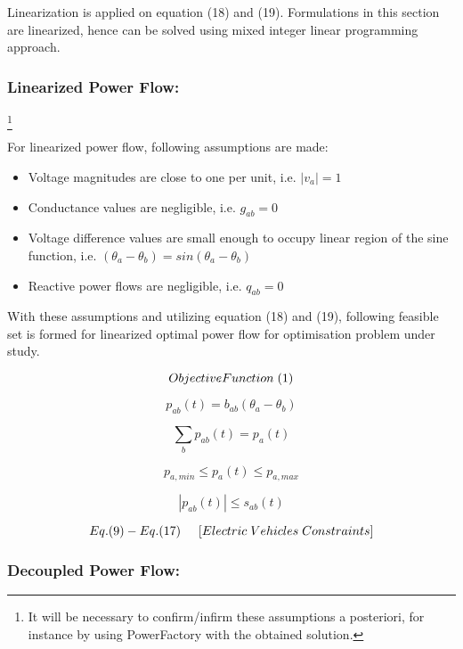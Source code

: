 Linearization is applied on equation (18) and (19). Formulations in this section are linearized, hence can be solved using mixed integer linear programming approach.

\subsubsection{Linearized Power Flow:}\footnote{It will be necessary to confirm/infirm these assumptions a posteriori, for instance by using PowerFactory with the obtained solution.}

For linearized power flow, following assumptions are made:
\begin{itemize}
    \item Voltage magnitudes are close to one per unit, i.e. $|v_a|=1$
    \item Conductance values are negligible, i.e. $g_{ab}=0$
    \item Voltage difference values are small enough to occupy linear region of the sine function, i.e. $(\theta_a - \theta_b)=sin(\theta_a - \theta_b)$
    \item Reactive power flows are negligible, i.e. $q_{ab}=0$
\end{itemize}

With these assumptions and utilizing equation (18) and (19), following feasible set is formed for linearized optimal power flow for optimisation problem under study. 

\begin{tcolorbox}[colback=gray!5!white,colframe=gray!25!black,title=Feasible Set 1 (Linearized Power Flow)]
\[
Objective Function\hspace{0.1cm}(1)
\]

\[
  p_{ab}(t)=b_{ab}(\theta_a - \theta_b)
\]

\[
\sum_b p_{ab}(t)=p_a(t)
\]

\[
p_{a,min}\leq p_{a}(t)\leq p_{a,max}
\]

\[
|p_{ab}(t)|\leq s_{ab}(t)
\]

\[
Eq.(9) - Eq.(17) \hspace{0.5cm} [Electric \hspace{0.1cm} Vehicles \hspace{0.1cm}  Constraints] 
\]

\end{tcolorbox}

\subsubsection{Decoupled Power Flow:}

